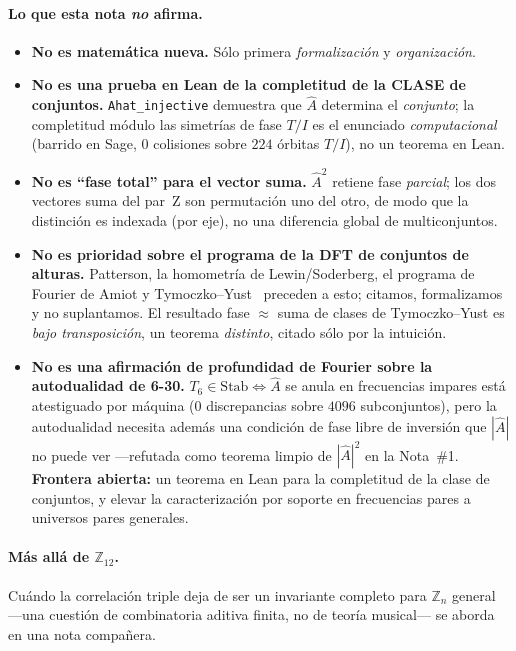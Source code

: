 \documentclass[11pt]{article}
\newcommand{\lean}[1]{\texttt{#1}}
\newcommand{\Ztwelve}{\mathbb{Z}_{12}}
\newcommand{\Zn}[1]{\mathbb{Z}_{#1}}
\newcommand{\Ahat}{\hat{A}}
\newcommand{\Stab}{\mathrm{Stab}}
\begin{document}
\paragraph{Lo que esta nota \emph{no} afirma.}
\begin{itemize}\itemsep2pt
  \item \textbf{No es matemática nueva.} Sólo primera \emph{formalización} y \emph{organización}.
  \item \textbf{No es una prueba en Lean de la completitud de la CLASE de conjuntos.}
        \lean{Ahat\_injective} demuestra que $\Ahat$ determina el \emph{conjunto}; la completitud módulo
        las simetrías de fase $T/I$ es el enunciado \emph{computacional} (barrido en Sage, $0$ colisiones
        sobre $224$ órbitas $T/I$), no un teorema en Lean.
  \item \textbf{No es ``fase total'' para el vector suma.} $\Ahat^2$ retiene fase \emph{parcial}; los dos
        vectores suma del par~Z son permutación uno del otro, de modo que la distinción es indexada (por
        eje), no una diferencia global de multiconjuntos.
  \item \textbf{No es prioridad sobre el programa de la DFT de conjuntos de alturas.} Patterson, la
        homometría de Lewin/Soderberg, el programa de Fourier de Amiot y Tymoczko--Yust~\cite{TY} preceden
        a esto; citamos, formalizamos y no suplantamos. El resultado fase $\approx$ suma de clases de
        Tymoczko--Yust es \emph{bajo transposición}, un teorema \emph{distinto}, citado sólo por la
        intuición.
  \item \textbf{No es una afirmación de profundidad de Fourier sobre la autodualidad de 6-30.}
        $T_6\in\Stab\iff\Ahat$ se anula en frecuencias impares está atestiguado por máquina ($0$
        discrepancias sobre $4096$ subconjuntos), pero la autodualidad necesita además una condición de
        fase libre de inversión que $|\Ahat|$ no puede ver ---refutada como teorema limpio de $|\Ahat|^2$
        en la Nota~\#1. \textbf{Frontera abierta:} un teorema en Lean para la completitud de la clase de
        conjuntos, y elevar la caracterización por soporte en frecuencias pares a universos pares generales.
\end{itemize}

\paragraph{Más allá de $\Ztwelve$.} Cuándo la correlación triple deja de ser un invariante completo para
$\Zn{n}$ general ---una cuestión de combinatoria aditiva finita, no de teoría musical--- se aborda en una
nota compañera.
\end{document}
